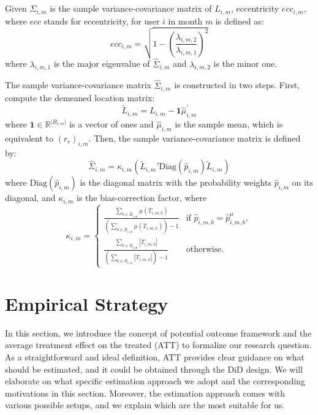 \begin{definition}[Eccentricity]
Given $\hat{\Sigma}_{i, m}$ is the sample variance-covariance matrix of $L_{i, m}$, eccentricity $ecc_{i, m}$, where $ecc$ stands for eccentricity, for user $i$ in month $m$ is defined as:
\[
ecc_{i, m}
=
\sqrt{
    1
    -
    \left(
        \frac{\lambda_{i, m, 2}}{\lambda_{i, m, 1}}
    \right)^2
}
\]
where $\lambda_{i, m, 1}$ is the major eigenvalue of $\hat{\Sigma}_{i, m}$ and $\lambda_{i, m, 2}$ is the minor one.
\end{definition}

The sample variance-covariance matrix $\hat{\Sigma}_{i, m}$ is constructed in two steps.
First, compute the demeaned location matrix:
\[
\tilde{L}_{i, m}
=
L_{i, m}
-
\mathbf{1}\hat{\mu}_{i, m}^{'}
\]
where $\mathbf{1} \in \mathbb{R}^{\lvert B_{i, m} \rvert }$ is a vector of ones and $\hat{\mu}_{i, m}$ is the sample mean, which is equivalent to $(r_c)_{i, m}$.
Then, the sample variance-covariance matrix is defined by:
\[
\hat{\Sigma}_{i, m}
=
\kappa_{i, m} (
    \tilde{L}_{i, m}'
    \text{Diag}(\hat{p}_{i, m})
    \tilde{L}_{i, m}
)
\]
where $\text{Diag}(\hat{p}_{i, m})$ is the diagonal matrix with the probability weights $\hat{p}_{i, m}$ on its diagonal, and $\kappa_{i, m}$ is the bias-correction factor, where
\[
\kappa_{i, m} =
\begin{cases}
\frac{
\sum_{b \in B_{i, m}} \mu(T_{i, m, b})
}{
\left( \sum_{b \in B_{i, m}} \mu(T_{i, m, b}) \right) - 1
} & \text{if } \hat{p}_{i, m, b} = \hat{p}^{\mu}_{i, m, b}, \\[0.5em]
\frac{
\sum_{b \in B_{i, m}} |T_{i, m, b}|
}{
\left( \sum_{b \in B_{i, m}} |T_{i, m, b}| \right) - 1
} & \text{otherwise}.
\end{cases}
\]



\clearpage\newpage
\section{Empirical Strategy}
In this section, we introduce the concept of potential outcome framework and the average treatment effect on the treated (ATT) to formalize our research question.
As a straightforward and ideal definition, ATT provides clear guidance on what should be estimated, and it could be obtained through the DiD design.
We will elaborate on what specific estimation approach we adopt and the corresponding motivations in this section.
Moreover, the estimation approach comes with various possible setups, and we explain which are the most suitable for us.

